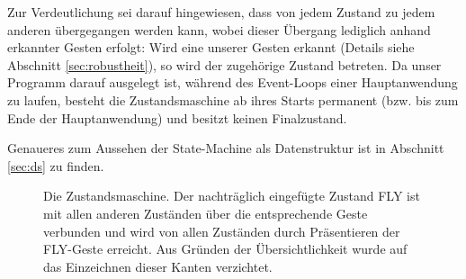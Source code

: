 	Zur Verdeutlichung sei darauf hingewiesen, dass von jedem Zustand zu jedem anderen übergegangen werden kann, wobei dieser Übergang lediglich anhand erkannter Gesten erfolgt: Wird eine unserer Gesten erkannt (Details siehe Abschnitt \ref{sec:robustheit}), so wird der zugehörige Zustand betreten. Da unser Programm darauf ausgelegt ist, während des Event-Loops einer Hauptanwendung zu laufen, besteht die Zustandsmaschine ab ihres Starts permanent (bzw. bis zum Ende der Hauptanwendung) und besitzt keinen Finalzustand.\par
	Genaueres zum Aussehen der State-Machine als Datenstruktur ist in Abschnitt \ref{sec:ds} zu finden.
	\begin{figure}[h!]\label{fig:sm}
	\centering
	
	\caption{Die Zustandsmaschine. Der nachträglich eingefügte Zustand FLY ist mit allen anderen Zuständen über die entsprechende Geste verbunden und wird von allen Zuständen durch Präsentieren der FLY-Geste erreicht. Aus Gründen der Übersichtlichkeit wurde auf das Einzeichnen dieser Kanten verzichtet.}
	\end{figure}
